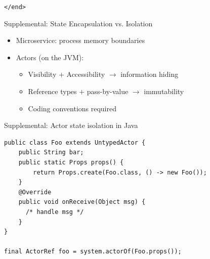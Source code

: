 \documentclass{beamer}
\begin{document}
\begin{frame}{}

\begin{center}
  \texttt{</end>}
\end{center}

\end{frame}


\begin{frame}{Supplemental: State Encapsulation vs. Isolation}

\begin{itemize}
  \item Microservice: process memory boundaries
  \item Actors (on the JVM):
  \begin{itemize}
    \item Visibility $+$ Accessibility $\rightarrow$ information hiding
    \item Reference types $+$ pass-by-value $\rightarrow$ immutability
    \item Coding conventions required
  \end{itemize}
\end{itemize}

\end{frame}


\begin{frame}[fragile]{Supplemental: Actor state isolation in Java}

\begin{verbatim}
public class Foo extends UntypedActor {
    public String bar;
    public static Props props() {
        return Props.create(Foo.class, () -> new Foo());
    }
    @Override
    public void onReceive(Object msg) { 
      /* handle msg */ 
    }
}

final ActorRef foo = system.actorOf(Foo.props());
\end{verbatim}

\end{frame}

\end{document}
